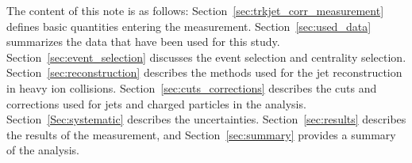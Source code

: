 The content of this note is as follows: 
Section~\ref{sec:trkjet_corr_measurement} defines basic quantities entering the 
measurement. 
Section~\ref{sec:used_data} 
summarizes the data that have been used for this study. 
Section~\ref{sec:event_selection} discusses the event selection and 
centrality selection. 
Section~\ref{sec:reconstruction} describes the methods used for 
the jet reconstruction in heavy ion collisions. 
Section~\ref{sec:cuts_corrections} describes the cuts 
and corrections used for jets and charged particles in the analysis. 
Section~\ref{Sec:systematic} describes the uncertainties.
Section~\ref{sec:results} describes the results of the measurement, and 
Section~\ref{sec:summary} provides a summary of the analysis.


